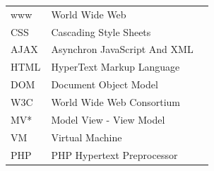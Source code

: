 \documentclass[a4paper,bibtotoc,oneside]{scrbook}
\begin{document}
\listoffigures
{} %
\newpage


\hspace{-17mm}\begin{tabular}{>{\raggedleft}p{0.2\linewidth} p{0.75\linewidth} p{0.1\linewidth}}

www & World Wide Web\\
CSS & Cascading Style Sheets\\
AJAX & Asynchron JavaScript And XML\\
HTML & HyperText Markup Language\\
DOM & Document Object Model\\
W3C & World Wide Web Consortium\\
MV* & Model View - View Model\\
VM & Virtual Machine\\
PHP & PHP Hypertext Preprocessor\\

\end{tabular}


\end{document}
